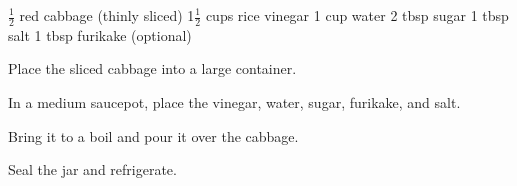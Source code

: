 \dishtype{}
\begin{ingreds}
    $\frac{1}{2}$ red cabbage (thinly sliced)
    1$\frac{1}{2}$ cups rice vinegar
    1 cup water
    2 tbsp sugar
    1 tbsp salt
    1 tbsp furikake (optional)
\end{ingreds}
\begin{method}
    Place the sliced cabbage into a large container.\par
    In a medium saucepot, place the vinegar, water, sugar, furikake, and salt.\par
    Bring it to a boil and pour it over the cabbage.\par
    Seal the jar and refrigerate.
\end{method}
